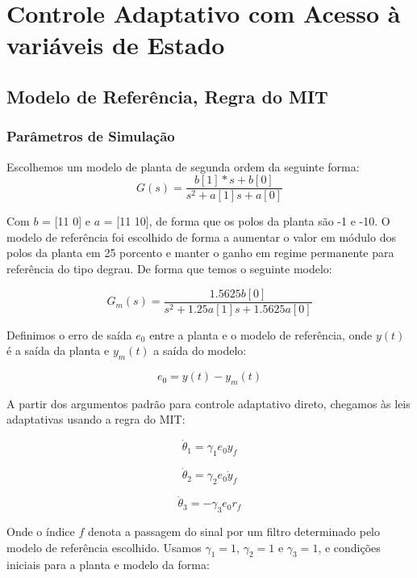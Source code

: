 \documentclass[11pt]{report}
\begin{document}
\chapter{Controle Adaptativo com Acesso à variáveis de Estado}
\section{Modelo de Referência, Regra do MIT}

\subsection{Parâmetros de Simulação}
Escolhemos um modelo de planta de segunda ordem da seguinte forma:
\begin{equation}
G(s) = \frac{b[1]*s + b[0]}{s^2 + a[1]s + a[0]}
\end{equation}

Com $b$ = [11 0] e $a$ = [11 10], de forma que os polos da planta são -1 e -10. O modelo de referência foi escolhido de forma a aumentar o valor em módulo dos polos da planta em 25 porcento e manter o ganho em regime permanente para referência do tipo degrau. De forma que temos o seguinte modelo:

\begin{equation}
G_m(s) = \frac{1.5625b[0]}{s^2 + 1.25a[1]s + 1.5625a[0]}
\end{equation} 

Definimos o erro de saída $e_0$ entre a planta e o modelo de referência, onde $y(t)$ é a saída da planta e $y_m(t)$ a saída do modelo:

\begin{equation}
e_0 = y(t) - y_m(t)
\end{equation}

A partir dos argumentos padrão para controle adaptativo direto, chegamos às leis adaptativas usando a regra do MIT:

\begin{equation}
\dot{\theta}_1 = \gamma_1 e_0 y_f
\end{equation}

\begin{equation}
\dot{\theta}_2 = \gamma_2 e_0 \dot{y}_f
\end{equation}

\begin{equation}
\dot{\theta}_3 = -\gamma_3 e_0 r_f
\end{equation}

Onde o índice $f$ denota a passagem do sinal por um filtro determinado pelo modelo de referência escolhido. Usamos $\gamma_1 = 1$, $\gamma_2=1$ e $\gamma_3=1$, e condições iniciais para a planta e modelo da forma:
\end{document}
